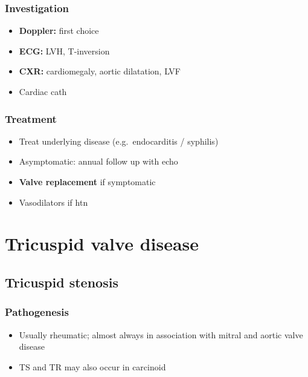 \documentclass[
  12pt,
]{memoir}
\providecommand{\tightlist}{%
  \setlength{\itemsep}{0pt}\setlength{\parskip}{0pt}}
\begin{document}
\hypertarget{investigation-12}{%
\subsubsection{Investigation}\label{investigation-12}}

\begin{itemize}
\tightlist
\item
  \textbf{Doppler:} first choice
\item
  \textbf{ECG:} LVH, T-inversion
\item
  \textbf{CXR:} cardiomegaly, aortic dilatation, LVF
\item
  Cardiac cath
\end{itemize}

\hypertarget{treatment-3}{%
\subsubsection{Treatment}\label{treatment-3}}

\begin{itemize}
\tightlist
\item
  Treat underlying disease (e.g.~endocarditis / syphilis)
\item
  Asymptomatic: annual follow up with echo
\item
  \textbf{Valve replacement} if symptomatic
\item
  Vasodilators if htn
\end{itemize}

\hypertarget{tricuspid-valve-disease}{%
\section{Tricuspid valve disease}\label{tricuspid-valve-disease}}

\hypertarget{tricuspid-stenosis}{%
\subsection{Tricuspid stenosis}\label{tricuspid-stenosis}}

\hypertarget{pathogenesis-9}{%
\subsubsection{Pathogenesis}\label{pathogenesis-9}}

\begin{itemize}
\tightlist
\item
  Usually rheumatic; almost always in association with mitral and aortic
  valve disease
\item
  TS and TR may also occur in carcinoid
\end{itemize}
\end{document}
